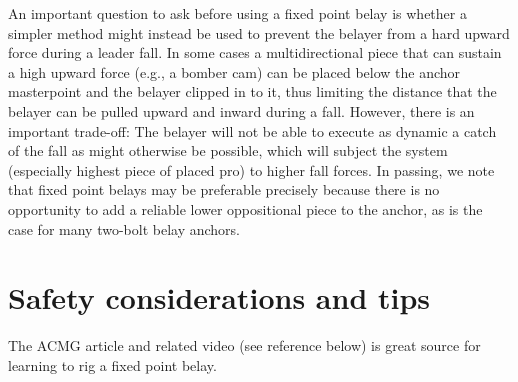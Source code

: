 \documentclass[nonacm,acmtog]{acmart}
\begin{document}
An important question to ask before using a fixed point belay is whether a
simpler method might instead be used to prevent the belayer from a hard upward
force during a leader fall. In some cases a multidirectional piece that can
sustain a high upward force (e.g., a bomber cam) can be placed below the anchor
masterpoint and the belayer clipped in to it, thus limiting the distance that
the belayer can be pulled upward and inward during a fall. However, there is an
important trade-off: The belayer will not be able to execute as dynamic a catch
of the fall as might otherwise be possible, which will subject the system
(especially highest piece of placed pro) to higher fall forces. In passing, we
note that fixed point belays may be preferable precisely because there is no
opportunity to add a reliable lower oppositional piece to the anchor, as is the
case for many two-bolt belay anchors.

\section{Safety considerations and tips}
The ACMG article and related video (see reference below) is great source for
learning to rig a fixed point belay.
\end{document}
